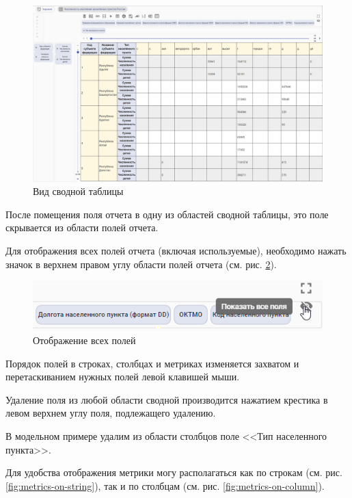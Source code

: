 \documentclass[../user-manual.tex]{subfiles}
\begin{document}
	\begin{figure}[h]
		\centering
		\includegraphics[width=\graphicswidth]{img/3-pivot-01.png}
		\caption{Вид сводной таблицы}
		\label{fig:pivot-01}
	\end{figure}	

	После помещения поля отчета в одну из областей сводной таблицы, это поле скрывается из области полей отчета.
	
	Для отображения всех полей отчета (включая используемые), необходимо нажать значок в верхнем правом углу области полей отчета (см. рис. \ref{fig:button-show-all}).
	
	\begin{figure}[h]
		\centering
		\includegraphics[width=\graphicswidth]{img/4-show-all-but.png}
		\caption{Отображение всех полей}
		\label{fig:button-show-all}
	\end{figure}	

	Порядок полей в строках, столбцах и метриках изменяется захватом и перетаскиванием нужных полей левой клавишей мыши.
	
	Удаление поля из любой области сводной производится нажатием крестика в левом верхнем углу поля, подлежащего удалению.
	
	\begin{modelExample}
		В модельном примере удалим из области столбцов поле <<Тип населенного пункта>>.
	\end{modelExample}
	
	
	Для удобства отображения метрики могу располагаться как по строкам (см. рис. \ref{fig:metrics-on-string}), так и по столбцам (см. рис. \ref{fig:metrics-on-column}). 
	
\end{document}
